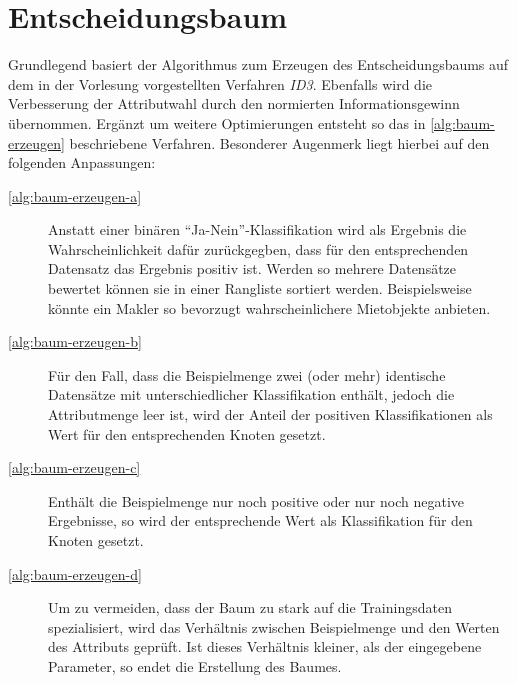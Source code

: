 \newpage
\section{Entscheidungsbaum}\label{sec:entscheidungsbaum}
Grundlegend basiert der Algorithmus zum Erzeugen des Entscheidungsbaums auf dem
in der Vorlesung vorgestellten Verfahren \emph{ID3}.
Ebenfalls wird die Verbesserung der Attributwahl durch den normierten Informationsgewinn übernommen.
Ergänzt um weitere Optimierungen entsteht so das in \autoref{alg:baum-erzeugen} beschriebene Verfahren.
Besonderer Augenmerk liegt hierbei auf den folgenden Anpassungen:
\begin{description}
    \item[\autoref{alg:baum-erzeugen-a}] Anstatt einer binären \enquote{Ja-Nein}-Klassifikation wird als Ergebnis die Wahrscheinlichkeit dafür zurückgegben,
                    dass für den entsprechenden Datensatz das Ergebnis positiv ist.
                    Werden so mehrere Datensätze bewertet können sie in einer Rangliste sortiert werden.
                    Beispielsweise könnte ein Makler so bevorzugt wahrscheinlichere Mietobjekte anbieten.
    \item[\autoref{alg:baum-erzeugen-b}] Für den Fall, dass die Beispielmenge zwei (oder mehr) identische Datensätze mit unterschiedlicher Klassifikation enthält,
    jedoch die Attributmenge leer ist, wird der Anteil der positiven Klassifikationen als Wert für den entsprechenden Knoten gesetzt.
    \item[\autoref{alg:baum-erzeugen-c}] Enthält die Beispielmenge nur noch positive oder nur noch negative Ergebnisse,
        so wird der entsprechende Wert als Klassifikation für den Knoten gesetzt.
    \item[\autoref{alg:baum-erzeugen-d}] Um zu vermeiden, dass der Baum zu stark auf die Trainingsdaten spezialisiert,
        wird das Verhältnis zwischen Beispielmenge und den Werten des Attributs geprüft.
        Ist dieses Verhältnis kleiner, als der eingegebene Parameter, so endet die Erstellung des Baumes.

\end{description}

